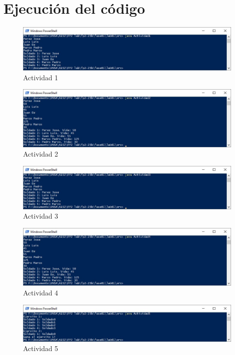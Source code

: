 \documentclass{article}
\begin{document}
\section{Ejecución del código}
\begin{figure}[H]
	\centering
	\includegraphics[width=1\textwidth,keepaspectratio]{img/ejec01.jpg}
	\caption{Actividad 1}
\end{figure}
\begin{figure}[H]
	\centering
	\includegraphics[width=1\textwidth,keepaspectratio]{img/ejec02.jpg}
	\caption{Actividad 2}
\end{figure}
\begin{figure}[H]
	\centering
	\includegraphics[width=1\textwidth,keepaspectratio]{img/ejec03.jpg}
	\caption{Actividad 3}
\end{figure}
\begin{figure}[H]
	\centering
	\includegraphics[width=1\textwidth,keepaspectratio]{img/ejec04.jpg}
	\caption{Actividad 4}
\end{figure}
\begin{figure}[H]
	\centering
	\includegraphics[width=1\textwidth,keepaspectratio]{img/ejec05.jpg}
	\caption{Actividad 5}
\end{figure}
\clearpage
\end{document}
